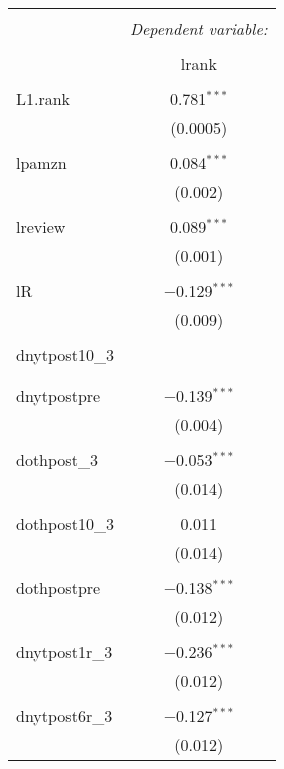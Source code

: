 
\begin{table}[!htbp] \centering 
  \caption{} 
  \label{} 
\begin{tabular}{@{\extracolsep{5pt}}lc} 
\\[-1.8ex]\hline 
\hline \\[-1.8ex] 
 & \multicolumn{1}{c}{\textit{Dependent variable:}} \\ 
\cline{2-2} 
\\[-1.8ex] & lrank \\ 
\hline \\[-1.8ex] 
 L1.rank & 0.781$^{***}$ \\ 
  & (0.0005) \\ 
  & \\ 
 lpamzn & 0.084$^{***}$ \\ 
  & (0.002) \\ 
  & \\ 
 lreview & 0.089$^{***}$ \\ 
  & (0.001) \\ 
  & \\ 
 lR & $-$0.129$^{***}$ \\ 
  & (0.009) \\ 
  & \\ 
 dnytpost10\_3 &  \\ 
  &  \\ 
  & \\ 
 dnytpostpre & $-$0.139$^{***}$ \\ 
  & (0.004) \\ 
  & \\ 
 dothpost\_3 & $-$0.053$^{***}$ \\ 
  & (0.014) \\ 
  & \\ 
 dothpost10\_3 & 0.011 \\ 
  & (0.014) \\ 
  & \\ 
 dothpostpre & $-$0.138$^{***}$ \\ 
  & (0.012) \\ 
  & \\ 
 dnytpost1r\_3 & $-$0.236$^{***}$ \\ 
  & (0.012) \\ 
  & \\ 
 dnytpost6r\_3 & $-$0.127$^{***}$ \\ 
  & (0.012) \\ 

\end{tabular}
\end{table}
